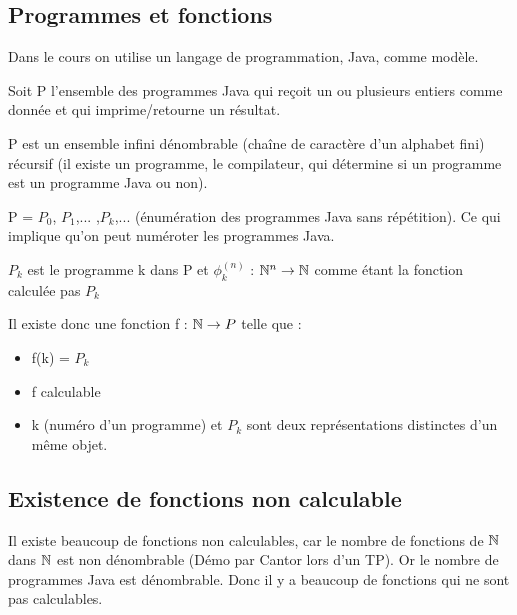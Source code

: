 
\subsection{Programmes et fonctions}
\label{sub:programmes_et_fonctions}
Dans le cours on utilise un langage de programmation, Java, comme modèle.

\begin{mydef}
	Soit P l'ensemble des programmes Java qui reçoit un ou plusieurs entiers comme 
	donnée et qui imprime/retourne un résultat.
\end{mydef}

\begin{myprop}
	P est un ensemble infini dénombrable (chaîne de caractère d'un 
	alphabet fini) récursif (il existe un programme, le compilateur, qui détermine 
	si un programme est un programme Java ou non).
\end{myprop}

\begin{mydef}
	P = $P_0$, $P_1$,... ,$P_k$,... (énumération des programmes Java 
	sans répétition). Ce qui implique qu'on peut numéroter les programmes Java.\\
\end{mydef}

\begin{mydef}
	$P_k$ est le programme k dans P et $\phi^{(n)}_k$ : $\mathbb{N}^n 
	\rightarrow \mathbb{N}$ comme étant la fonction calculée pas $P_k$
\end{mydef}


\begin{myprop}
	Il existe donc une fonction f : $\mathbb{N}\rightarrow P$ telle que :
	\begin{itemize}
		\item f(k) = $P_k$
		\item f calculable
		\item k (numéro d'un programme) et $P_k$ sont deux représentations 
			distinctes d'un même objet.
	\end{itemize}
\end{myprop}


\subsection{Existence de fonctions non calculable}
\label{sub:existence_de_fonction_non_calculables}
Il existe beaucoup de fonctions non calculables, car le nombre de fonctions de $\mathbb{N}$ 
dans $\mathbb{N}$ est non dénombrable (Démo par Cantor lors d'un TP). Or le nombre de 
programmes Java est dénombrable. Donc il y a beaucoup de fonctions qui ne sont 
pas calculables.


